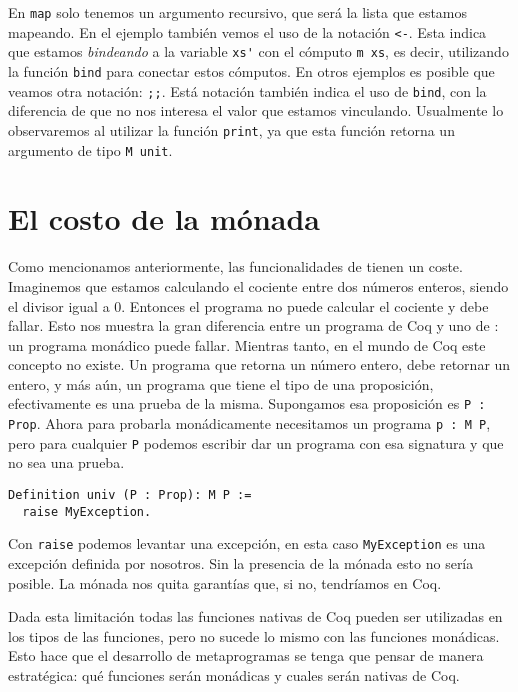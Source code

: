 En \lstinline{map} solo tenemos un argumento recursivo, que será la lista que estamos mapeando.
En el ejemplo también vemos el uso de la notación \lstinline{<-}.
Esta indica que estamos \emph{bindeando} a la variable \lstinline{xs'} con el cómputo \lstinline{m xs}, es decir, utilizando la función \lstinline{bind} para conectar estos cómputos.
En otros ejemplos es posible que veamos otra notación: \lstinline{;;}.
Está notación también indica el uso de \lstinline{bind}, con la diferencia de que no nos interesa el valor que estamos vinculando.
Usualmente lo observaremos al utilizar la función \lstinline{print}, ya que esta función retorna un argumento de tipo \lstinline{M unit}.

\section{El costo de la mónada}

Como mencionamos anteriormente, las funcionalidades de \Mtac tienen un coste.
Imaginemos que estamos calculando el cociente entre dos números enteros, siendo el divisor igual a 0.
Entonces el programa no puede calcular el cociente y debe fallar.
Esto nos muestra la gran diferencia entre un programa de Coq y uno de \mtac: un programa monádico puede fallar.
Mientras tanto, en el mundo de Coq este concepto no existe.
Un programa que retorna un número entero, debe retornar un entero, y más aún, un programa que tiene el tipo de una proposición, efectivamente es una prueba de la misma.
Supongamos esa proposición es \lstinline{P : Prop}.
Ahora para probarla monádicamente necesitamos un programa \lstinline{p : M P}, pero para cualquier \lstinline{P} podemos escribir dar un programa con esa signatura y que no sea una prueba.

\begin{lstlisting}
Definition univ (P : Prop): M P :=
  raise MyException.
\end{lstlisting}

Con \lstinline{raise} podemos levantar una excepción, en esta caso \lstinline{MyException} es una excepción definida por nosotros.
Sin la presencia de la mónada esto no sería posible.
La mónada nos quita garantías que, si no, tendríamos en Coq.

Dada esta limitación todas las funciones nativas de Coq pueden ser utilizadas en los tipos de las funciones, pero no sucede lo mismo con las funciones monádicas.
Esto hace que el desarrollo de metaprogramas se tenga que pensar de manera estratégica: qué funciones serán monádicas y cuales serán nativas de Coq.

